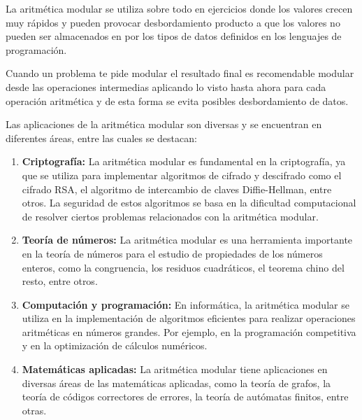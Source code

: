 La aritmética modular se utiliza sobre todo en ejercicios donde los valores crecen muy rápidos y pueden provocar desbordamiento producto a que los valores no pueden ser almacenados en por los tipos de datos definidos en los lenguajes de programación.

Cuando un problema te pide modular el resultado final es recomendable modular desde las operaciones intermedias aplicando lo visto hasta ahora para cada operación aritmética y de esta forma se evita posibles desbordamiento de datos.  

Las aplicaciones de la aritmética modular son diversas y se encuentran en diferentes áreas, entre las cuales se destacan:

\begin{enumerate}
	\item \textbf{Criptografía:} La aritmética modular es fundamental en la criptografía, ya que se utiliza para implementar algoritmos de cifrado y descifrado como el cifrado RSA, el algoritmo de intercambio de claves Diffie-Hellman, entre otros. La seguridad de estos algoritmos se basa en la dificultad computacional de resolver ciertos problemas relacionados con la aritmética modular.
	
	\item \textbf{Teoría de números:} La aritmética modular es una herramienta importante en la teoría de números para el estudio de propiedades de los números enteros, como la congruencia, los residuos cuadráticos, el teorema chino del resto, entre otros.
	
	\item \textbf{Computación y programación:} En informática, la aritmética modular se utiliza en la implementación de algoritmos eficientes para realizar operaciones aritméticas en números grandes. Por ejemplo, en la programación competitiva y en la optimización de cálculos numéricos.
	
	\item \textbf{Matemáticas aplicadas:} La aritmética modular tiene aplicaciones en diversas áreas de las matemáticas aplicadas, como la teoría de grafos, la teoría de códigos correctores de errores, la teoría de autómatas finitos, entre otras.
	
\end{enumerate}

